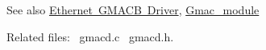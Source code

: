 \begin{DoxySeeAlso}{See also}
\mbox{\hyperlink{group__gmacb__module}{Ethernet G\+M\+A\+CB Driver}}, \mbox{\hyperlink{group__gmac__module}{Gmac\+\_\+module}}
\end{DoxySeeAlso}
Related files\+:~\newline
gmacd.\+c~\newline
 gmacd.\+h.~\newline
 